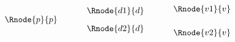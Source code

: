 $
\begin{array}{cp{0.5cm}cp{0.5cm}c}
               &  &                  & &     \Rnode{v1}{v}   \\[-0.35cm]
               &  &   \Rnode{d1}{d}  & &                    \\[-0.05cm]
\Rnode{p}{p}   &  &                  & &                    \\[-0.05cm]
               &  &   \Rnode{d2}{d}  & &                    \\[-0.25cm]
               &  &                  & &     \Rnode{v2}{v}
\end{array}
$
\idcomp 
{}
\idcomp 
{}
\idcomp
